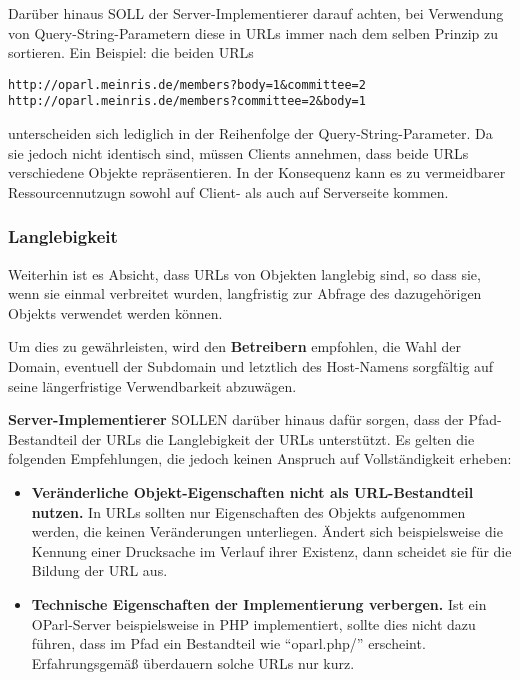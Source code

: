 \documentclass[,a4paper]{article}
\begin{document}
Darüber hinaus SOLL der Server-Implementierer darauf achten, bei
Verwendung von Query-String-Parametern diese in URLs immer nach dem
selben Prinzip zu sortieren. Ein Beispiel: die beiden URLs

\begin{verbatim}
http://oparl.meinris.de/members?body=1&committee=2
http://oparl.meinris.de/members?committee=2&body=1
\end{verbatim}

unterscheiden sich lediglich in der Reihenfolge der
Query-String-Parameter. Da sie jedoch nicht identisch sind, müssen
Clients annehmen, dass beide URLs verschiedene Objekte repräsentieren.
In der Konsequenz kann es zu vermeidbarer Ressourcennutzugn sowohl auf
Client- als auch auf Serverseite kommen.

\subsubsection{Langlebigkeit}\label{langlebigkeit}

Weiterhin ist es Absicht, dass URLs von Objekten langlebig sind, so dass
sie, wenn sie einmal verbreitet wurden, langfristig zur Abfrage des
dazugehörigen Objekts verwendet werden können.

Um dies zu gewährleisten, wird den \textbf{Betreibern} empfohlen, die
Wahl der Domain, eventuell der Subdomain und letztlich des Host-Namens
sorgfältig auf seine längerfristige Verwendbarkeit abzuwägen.

\textbf{Server-Implementierer} SOLLEN darüber hinaus dafür sorgen, dass
der Pfad-Bestandteil der URLs die Langlebigkeit der URLs unterstützt. Es
gelten die folgenden Empfehlungen, die jedoch keinen Anspruch auf
Vollständigkeit erheben:

\begin{itemize}
\item
  \textbf{Veränderliche Objekt-Eigenschaften nicht als URL-Bestandteil
  nutzen.} In URLs sollten nur Eigenschaften des Objekts aufgenommen
  werden, die keinen Veränderungen unterliegen. Ändert sich
  beispielsweise die Kennung einer Drucksache im Verlauf ihrer Existenz,
  dann scheidet sie für die Bildung der URL aus.
\item
  \textbf{Technische Eigenschaften der Implementierung verbergen.} Ist
  ein OParl-Server beispielsweise in PHP implementiert, sollte dies
  nicht dazu führen, dass im Pfad ein Bestandteil wie ``oparl.php/''
  erscheint. Erfahrungsgemäß überdauern solche URLs nur kurz.
\end{itemize}
\end{document}
